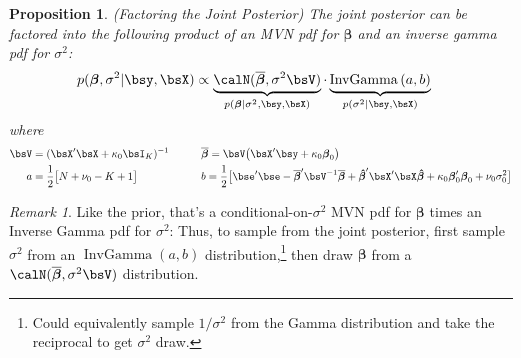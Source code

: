 \documentclass[12pt]{article}
\theoremstyle{plain}
\newtheorem{prop}[thm]{Proposition}
\theoremstyle{definition}
\theoremstyle{remark}
\newtheorem*{rmk}{Remark}
\newcommand{\bsbeta}{\boldsymbol{\beta}}
\newcommand{\bshatbeta}{\boldsymbol{\hat{\beta}}}
\newcommand{\bsbarbeta}{\boldsymbol{\overline{\beta}}}
\begin{document}
\clearpage

\begin{prop}
\label{prop:posteriornormal}
\emph{(Factoring the Joint Posterior)}
The joint posterior can be factored into the following product of an MVN
pdf for $\bsbeta$ and an inverse gamma pdf for $\sigma^2$:
\begin{align}
  p(\bsbeta, \sigma^2 | \bsy,\bsX)
  &\propto
  \underbrace{%
    \calN(\bsbarbeta,\sigma^2\bsV)
  }_{p(\bsbeta| \sigma^2 , \bsy,\bsX)}
  \cdot
  \underbrace{%
    \operatorname{InvGamma}\left(a,b\right)
  }_{p(\sigma^2 | \bsy,\bsX)}
  \label{posteriornormal}
\end{align}
where
\begin{alignat}{3}
  \bsV&=(\bsX'\bsX+\kappa_0\bsI_K)^{-1}
  \qquad
  &&\bsbarbeta
  = \bsV\big(\bsX'\bsy + \kappa_0\bsbeta_0\big) \notag\\
  a&=\frac{1}{2} \big[N+\nu_0-K+1\big]
  \qquad
  &&b=
  \frac{1}{2}
  \big[
    \bse'\bse
    - \bsbarbeta'\bsV^{-1}\bsbarbeta
    + \bshatbeta'\bsX'\bsX\bshatbeta
    + \kappa_0\bsbeta_0'\bsbeta_0
    +\nu_0\sigma^2_0
  \big]
  \notag
\end{alignat}
\end{prop}
\begin{rmk}
Like the prior, that's a conditional-on-$\sigma^2$ MVN pdf for $\bsbeta$
times an Inverse Gamma pdf for $\sigma^2$:
Thus, to sample from the joint posterior, first sample $\sigma^2$ from
an $\operatorname{InvGamma}(a,b)$ distribution,\footnote{%
  Could equivalently sample $1/\sigma^2$ from the Gamma distribution
  and take the reciprocal to get $\sigma^2$ draw.
}
then draw $\bsbeta$ from a $\calN(\bsbarbeta,\sigma^2\bsV)$
distribution.
\end{rmk}
\end{document}
